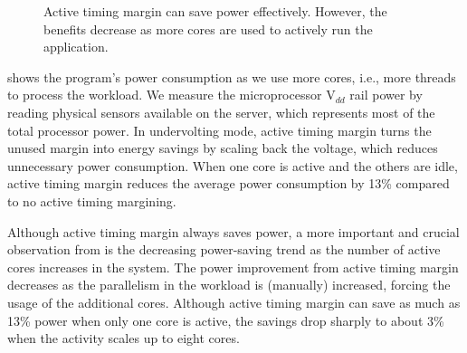 \begin{figure}[t]
	\centering
    \caption{Active timing margin can save power effectively. However, the benefits decrease as more cores are used to actively run the application.}
    \label{fig:raytrace-inefficiency}
\end{figure}

 shows the program's power consumption as we use more cores, i.e., more threads to process the workload. We measure the microprocessor V$_{dd}$ rail power by reading physical sensors available on the server, which represents most of the total processor power. In undervolting mode, active timing margin turns the unused margin into energy savings by scaling back the voltage, which reduces unnecessary power consumption. When one core is active and the others are idle, active timing margin reduces the average power consumption by 13\% compared to no active timing margining. 

Although active timing margin always saves power, a more important and crucial observation from  is the decreasing power-saving trend as the number of active cores increases in the system. The power improvement from active timing margin decreases as the parallelism in the workload is (manually) increased, forcing the usage of the additional cores. Although active timing margin can save as much as 13\% power when only one core is active, the savings drop sharply to about 3\% when the activity scales up to eight cores.

